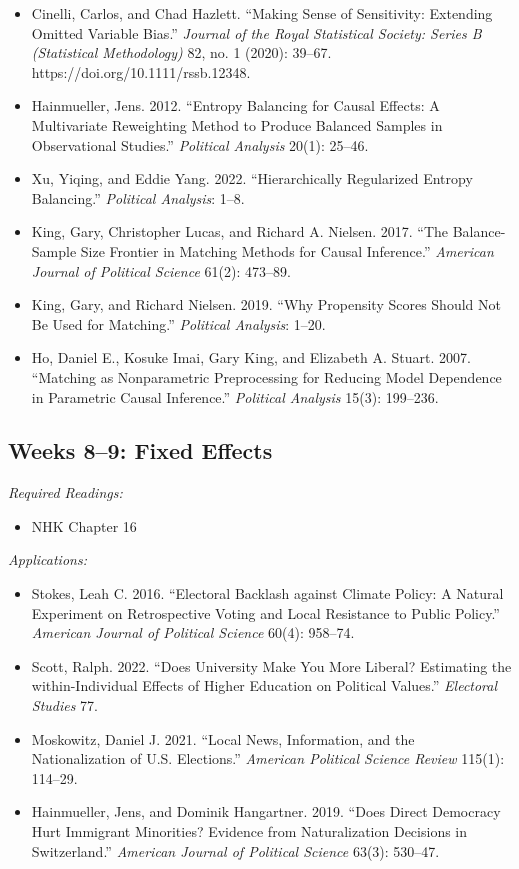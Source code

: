 \documentclass[11pt, letterpaper]{article}
\begin{document}
\begin{itemize}
	\item Cinelli, Carlos, and Chad Hazlett. ``Making Sense of Sensitivity: Extending Omitted Variable Bias.'' \textit{Journal of the Royal Statistical Society: Series B (Statistical Methodology)} 82, no. 1 (2020): 39–67. https://doi.org/10.1111/rssb.12348.
	\item Hainmueller, Jens. 2012. ``Entropy Balancing for Causal Effects: A Multivariate Reweighting Method to Produce Balanced Samples in Observational Studies.'' \textit{Political Analysis} 20(1): 25–46.
	\item Xu, Yiqing, and Eddie Yang. 2022. ``Hierarchically Regularized Entropy Balancing.'' \textit{Political Analysis}: 1–8.
	\item King, Gary, Christopher Lucas, and Richard A. Nielsen. 2017. ``The Balance-Sample Size Frontier in Matching Methods for Causal Inference.'' \textit{American Journal of Political Science} 61(2): 473–89.
	\item King, Gary, and Richard Nielsen. 2019. ``Why Propensity Scores Should Not Be Used for Matching.'' \textit{Political Analysis}: 1–20.
	\item Ho, Daniel E., Kosuke Imai, Gary King, and Elizabeth A. Stuart. 2007. “Matching as Nonparametric Preprocessing for Reducing Model Dependence in Parametric Causal Inference.” \textit{Political Analysis} 15(3): 199–236.
\end{itemize}

\subsection*{Weeks 8--9: Fixed Effects}

\textit{Required Readings:}

\begin{itemize}
	\item NHK Chapter 16
\end{itemize}

\noindent \textit{Applications:}

\begin{itemize}
	\item Stokes, Leah C. 2016. ``Electoral Backlash against Climate Policy: A Natural Experiment on Retrospective Voting and Local Resistance to Public Policy.'' \textit{American Journal of Political Science} 60(4): 958–74.
	\item Scott, Ralph. 2022. “Does University Make You More Liberal? Estimating the within-Individual Effects of Higher Education on Political Values.” \textit{Electoral Studies} 77.
	\item Moskowitz, Daniel J. 2021. “Local News, Information, and the Nationalization of U.S. Elections.” \textit{American Political Science Review} 115(1): 114–29.
	\item Hainmueller, Jens, and Dominik Hangartner. 2019. “Does Direct Democracy Hurt Immigrant Minorities? Evidence from Naturalization Decisions in Switzerland.” \textit{American Journal of Political Science} 63(3): 530–47.
\end{itemize}
\end{document}
